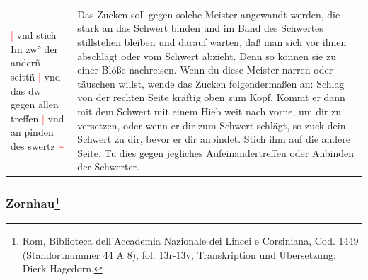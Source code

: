 \begin{longtable}{p{6.25cm}p{6.25cm}}
    \textcolor{red}{|} vnd stich Im zw° der anderñ seittñ
    \textcolor{red}{|} vnd das dw gegen allen treffen
    \textcolor{red}{|} vnd an pinden des swertz \textcolor{red}{\textasciitilde{}}
    &
    Das Zucken soll gegen solche Meister angewandt werden, die stark an das Schwert binden und im Band des Schwertes stillstehen bleiben und darauf warten, daß man sich vor ihnen abschlägt oder vom Schwert abzieht.
    Denn so können sie zu einer Blöße nachreisen.
    Wenn du diese Meister narren oder täuschen willst, wende das Zucken folgendermaßen an: Schlag von der rechten Seite kräftig oben zum Kopf.
    Kommt er dann mit dem Schwert mit einem Hieb weit nach vorne, um dir zu versetzen, oder wenn er dir zum Schwert schlägt, so zuck dein Schwert zu dir, bevor er dir anbindet.
    Stich ihm auf die andere Seite.
    Tu dies gegen jegliches Aufeinandertreffen oder Anbinden der Schwerter.
\end{longtable}

\newpage

\begin{center}
\end{center}

\newpage

\subsubsection[Zornhau]{
    Zornhau\footnote{
        \hspace*{0.5ex}Rom, Biblioteca dell'Accademia Nazionale dei Lincei e Corsiniana,
        Cod. 1449 (Standortnummer 44 A 8), fol. 13r-13v, Transkription und Übersetzung: Dierk Hagedorn.}}

